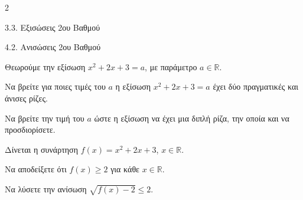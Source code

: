 \begin{ylh}{2}
    \item 3.3. Εξισώσεις 2ου Βαθμού
    \item 4.2. Ανισώσεις 2ου Βαθμού
\end{ylh}

\begin{alist}
\item Θεωρούμε την εξίσωση $x^{2} + 2x + 3 = a$, με παράμετρο $a\mathbb{\in R}$.
\begin{rlist}
\item Να βρείτε για ποιες τιμές του $a$ η εξίσωση $x^{2} + 2x + 3 = a$ έχει δύο πραγματικές και άνισες ρίζες.
\item Να βρείτε την τιμή του $a$ ώστε η εξίσωση να έχει μια διπλή ρίζα, την οποία και να προσδιορίσετε.
\end{rlist}
\item Δίνεται η συνάρτηση $f(x) = x^{2} + 2x + 3$, $x\mathbb{\in R}$.
\begin{alist}
\item Να αποδείξετε ότι $f(x) \geq 2$ για κάθε $x\mathbb{\in R}$.
\item Να λύσετε την ανίσωση $\sqrt{f(x) - 2} \leq 2$.
\end{alist}
\end{alist}


